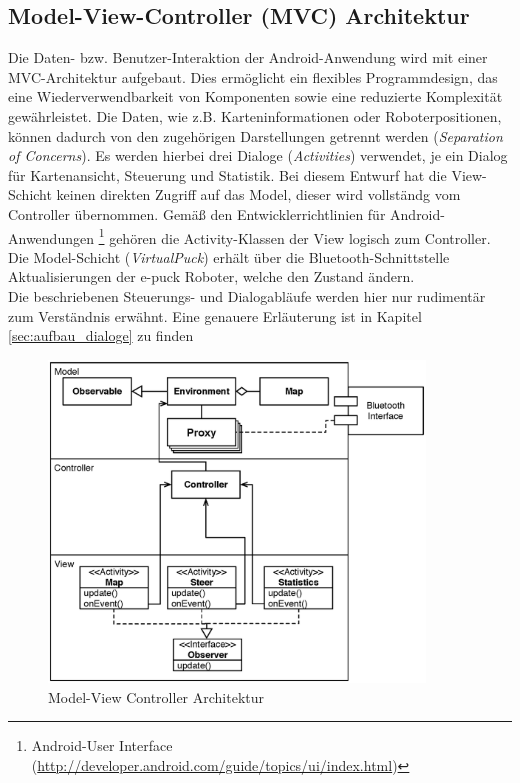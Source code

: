 \documentclass[10pt,a4paper]{article}
\begin{document}
			\subsection{Model-View-Controller (MVC) Architektur}
				Die Daten- bzw. Benutzer-Interaktion der Android-Anwendung wird mit einer MVC-Architektur aufgebaut. Dies ermöglicht ein
				flexibles Programmdesign, das eine Wiederverwendbarkeit von Komponenten sowie eine reduzierte Komplexität gewährleistet.
				Die Daten, wie z.B. Karteninformationen oder Roboterpositionen, können dadurch von den zugehörigen Darstellungen getrennt werden
				(\textit{Separation of Concerns}). Es werden hierbei drei Dialoge (\textit{Activities}) verwendet, je ein Dialog für Kartenansicht, Steuerung und
				Statistik. Bei diesem Entwurf hat die View-Schicht keinen direkten Zugriff auf das Model, dieser wird vollständg vom
				Controller übernommen. Gemäß den Entwicklerrichtlinien für Android-Anwendungen 
				\footnote{Android-User Interface (\url{http://developer.android.com/guide/topics/ui/index.html})} gehören die Activity-Klassen der
				View logisch zum	Controller. Die Model-Schicht (\textit{VirtualPuck}) erhält über die Bluetooth-Schnittstelle Aktualisierungen der e-puck Roboter,
				welche den Zustand ändern.\\
				Die beschriebenen Steuerungs- und Dialogabläufe werden hier nur rudimentär zum Verständnis erwähnt. Eine genauere Erläuterung ist in
				Kapitel \ref{sec:aufbau_dialoge} zu finden
	  			\begin{figure}
					\centering
					\includegraphics[width=10cm]{images/android_mvc.eps}
  					\caption{Model-View Controller Architektur}
  					\label{fig:mvc}
 	 			\end{figure}					
\end{document}
